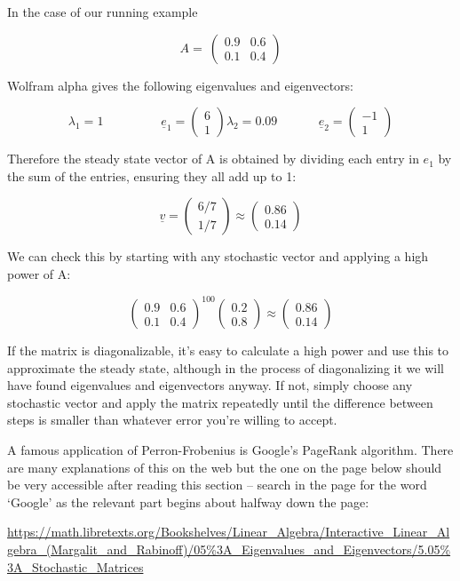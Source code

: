 \documentclass[oneside,english]{amsbook}
\numberwithin{section}{chapter}
\theoremstyle{plain}
\theoremstyle{definition}
\begin{document}
In the case of our running example

\[A = \ \begin{pmatrix}
	0.9 & 0.6 \\
	0.1 & 0.4
\end{pmatrix}\]

Wolfram alpha gives the following eigenvalues and eigenvectors:

\[{\lambda_{1} = 1\ \ \ \ \ \ \ \ \ \ \ \ \ \ \ \ \ \ \ \ \ {\underline{e}}_{1} = \begin{pmatrix}
		6 \\
		1
	\end{pmatrix}
}{\lambda_{2} = 0.09\ \ \ \ \ \ \ \ \ \ \ \ \ \ \ {\underline{e}}_{2} = \begin{pmatrix}
		- 1 \\
		1
\end{pmatrix}}\]

Therefore the steady state vector of A is obtained by dividing each
entry in $e_1$ by the sum of the entries, ensuring
they all add up to 1:

\[\underline{v} = \begin{pmatrix}
	6/7 \\
	1/7
\end{pmatrix} \approx \begin{pmatrix}
	0.86 \\
	0.14
\end{pmatrix}\]

\[
\]We can check this by starting with any stochastic vector and applying
a high power of A:

\[\begin{pmatrix}
	0.9 & 0.6 \\
	0.1 & 0.4
\end{pmatrix}^{100}\begin{pmatrix}
	0.2 \\
	0.8
\end{pmatrix} \approx \begin{pmatrix}
	0.86 \\
	0.14
\end{pmatrix}\]

If the matrix is diagonalizable, it's easy to calculate a high power and
use this to approximate the steady state, although in the process of
diagonalizing it we will have found eigenvalues and eigenvectors anyway.
If not, simply choose any stochastic vector and apply the matrix
repeatedly until the difference between steps is smaller than whatever
error you're willing to accept.

A famous application of Perron-Frobenius is Google's PageRank algorithm.
There are many explanations of this on the web but the one on the page
below should be very accessible after reading this section -- search in
the page for the word `Google' as the relevant part begins about
halfway down the page:

\url{https://math.libretexts.org/Bookshelves/Linear_Algebra/Interactive_Linear_Algebra_(Margalit_and_Rabinoff)/05\%3A_Eigenvalues_and_Eigenvectors/5.05\%3A_Stochastic_Matrices}
\end{document}
